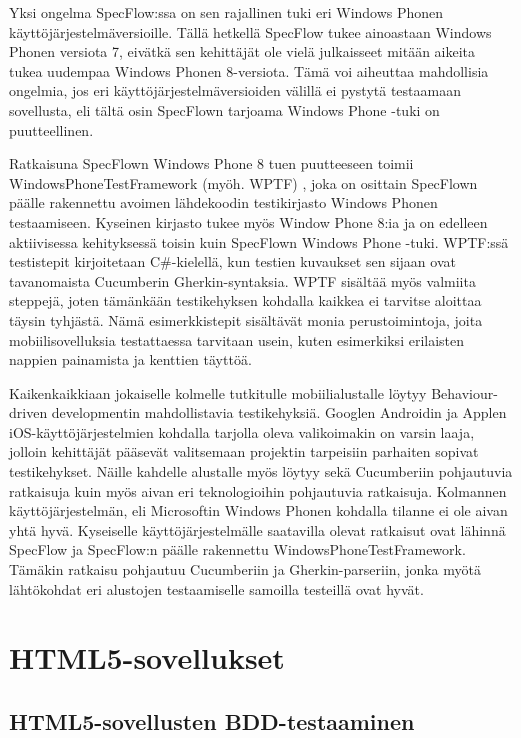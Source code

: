 \documentclass[finnish,nonumbib,nocopyright]{gradu2}
\begin{document}
Yksi ongelma SpecFlow:ssa on sen rajallinen tuki eri Windows Phonen käyttöjärjestelmäversioille. Tällä hetkellä SpecFlow tukee ainoastaan Windows Phonen versiota 7, eivätkä sen kehittäjät ole vielä julkaisseet mitään aikeita tukea uudempaa Windows Phonen 8-versiota. Tämä voi aiheuttaa mahdollisia ongelmia, jos eri käyttöjärjestelmäversioiden välillä ei pystytä testaamaan sovellusta, eli tältä osin SpecFlown tarjoama Windows Phone -tuki on puutteellinen.

Ratkaisuna SpecFlown Windows Phone 8 tuen puutteeseen toimii WindowsPhoneTestFramework (myöh. WPTF) \cite{wptf}, joka on osittain SpecFlown päälle rakennettu avoimen lähdekoodin testikirjasto Windows Phonen testaamiseen. Kyseinen kirjasto tukee myös Window Phone 8:ia ja on edelleen aktiivisessa kehityksessä toisin kuin SpecFlown Windows Phone -tuki. WPTF:ssä testistepit kirjoitetaan C\#-kielellä, kun testien kuvaukset sen sijaan ovat tavanomaista Cucumberin Gherkin-syntaksia. WPTF sisältää myös valmiita steppejä, joten tämänkään testikehyksen kohdalla kaikkea ei tarvitse aloittaa täysin tyhjästä. Nämä esimerkkistepit sisältävät monia perustoimintoja, joita mobiilisovelluksia testattaessa tarvitaan usein, kuten esimerkiksi erilaisten nappien painamista ja kenttien täyttöä.

Kaikenkaikkiaan jokaiselle kolmelle tutkitulle mobiilialustalle löytyy Behaviour-driven developmentin mahdollistavia testikehyksiä. Googlen Androidin ja Applen iOS-käyttöjärjestelmien kohdalla tarjolla oleva valikoimakin on varsin laaja, jolloin kehittäjät pääsevät valitsemaan projektin tarpeisiin parhaiten sopivat testikehykset. Näille kahdelle alustalle myös löytyy sekä Cucumberiin pohjautuvia ratkaisuja kuin myös aivan eri teknologioihin pohjautuvia ratkaisuja. Kolmannen käyttöjärjestelmän, eli Microsoftin Windows Phonen kohdalla tilanne ei ole aivan yhtä hyvä. Kyseiselle käyttöjärjestelmälle saatavilla olevat ratkaisut ovat lähinnä SpecFlow ja SpecFlow:n päälle rakennettu WindowsPhoneTestFramework. Tämäkin ratkaisu pohjautuu Cucumberiin ja Gherkin-parseriin, jonka myötä lähtökohdat eri alustojen testaamiselle samoilla testeillä ovat hyvät.

\section{HTML5-sovellukset}

\subsection{HTML5-sovellusten BDD-testaaminen}
\end{document}
